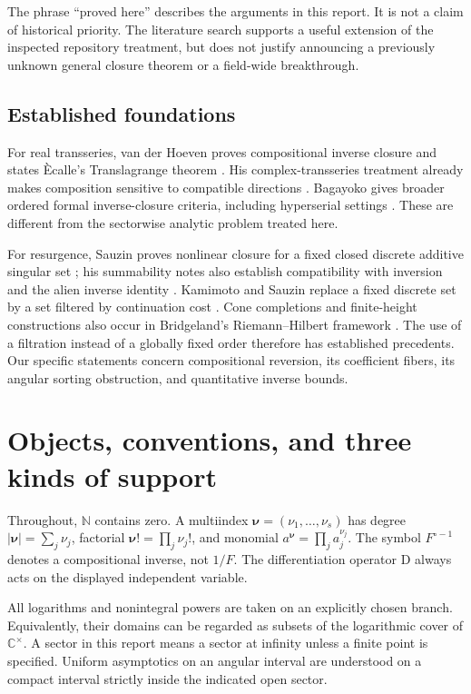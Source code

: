 \documentclass[11pt,a4paper]{article}
\numberwithin{equation}{section}
\theoremstyle{definition}
\theoremstyle{remark}
\newcommand{\C}{\mathbb C}
\newcommand{\N}{\mathbb N}
\newcommand{\D}{\mathrm D}
\newcommand{\nn}{\boldsymbol\nu}
\begin{document}
The phrase ``proved here'' describes the arguments in this report. It is not a
claim of historical priority. The literature search supports a useful extension
of the inspected repository treatment, but does not justify announcing a
previously unknown general closure theorem or a field-wide breakthrough.

\subsection{Established foundations}

For real transseries, van der Hoeven proves compositional inverse closure and
states \`Ecalle's Translagrange theorem \cite[Theorems 5.12--5.13]{vdh-book}.
His complex-transseries treatment already makes composition sensitive to
compatible directions \cite[Section 2.7]{vdh-complex}. Bagayoko gives broader
ordered formal inverse-closure criteria, including hyperserial settings
\cite[Theorem 3.1]{bagayoko}. These are different from the sectorwise analytic
problem treated here.

For resurgence, Sauzin proves nonlinear closure for a fixed closed discrete
additive singular set \cite{sauzin-nonlinear}; his summability notes also
establish compatibility with inversion and the alien inverse identity
\cite[Theorems 17.3 and 32.2]{sauzin-notes}. Kamimoto and Sauzin replace a fixed
discrete set by a set filtered by continuation cost \cite{kamimoto-sauzin}.
Cone completions and finite-height constructions also occur in Bridgeland's
Riemann--Hilbert framework \cite[Appendix A]{bridgeland}. The use of a filtration
instead of a globally fixed order therefore has established precedents. Our
specific statements concern compositional reversion, its coefficient fibers,
its angular sorting obstruction, and quantitative inverse bounds.

\section{Objects, conventions, and three kinds of support}\label{sec:objects}

Throughout, $\N$ contains zero. A multiindex $\nn=(\nu_1,\ldots,\nu_s)$ has
degree $|\nn|=\sum_j\nu_j$, factorial $\nn!=\prod_j\nu_j!$, and monomial
$a^{\nn}=\prod_j a_j^{\nu_j}$. The symbol $F^{\circ-1}$ denotes a compositional
inverse, not $1/F$. The differentiation operator $\D$ always acts on the
displayed independent variable.

All logarithms and nonintegral powers are taken on an explicitly chosen branch.
Equivalently, their domains can be regarded as subsets of the logarithmic
cover of $\C^\times$. A sector in this report means a sector at infinity unless
a finite point is specified. Uniform asymptotics on an angular interval are
understood on a compact interval strictly inside the indicated open sector.
\end{document}
